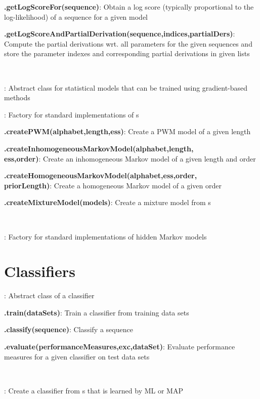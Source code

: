 \documentclass[10pt]{scrartcl}
\newcommand{\entry}[3]{{\bfseries #1#2}: #3}
\begin{document}
\begin{flushleft}
\entry{\DiffSM}{.getLogScoreFor(sequence)}{Obtain a log score (typically proportional to the log-likelihood) of a sequence for a given model}

\entry{\DiffSM}{.getLogScoreAndPartialDerivation(sequence,indices,partialDers)}{Compute the partial derivations wrt. all parameters for the given sequences and store the parameter indexes and corresponding partial derivations in given lists}

~

\entry{\AbstractDiffSM}{}{Abstract class for statistical models that can be trained using gradient-based methods}

\entry{\DiffSMFactory}{}{Factory for standard implementations of \DiffSM s}

\entry{\DiffSMFactory}{.createPWM(alphabet,length,ess)}{Create a PWM model of a given length}

\entry{\DiffSMFactory}{.createInhomogeneousMarkovModel(alphabet,length,\\ess,order)}{Create an inhomogeneous Markov model of a given length and order}

\entry{\DiffSMFactory}{.createHomogeneousMarkovModel(alphabet,ess,order,\\priorLength)}{Create a homogeneous Markov model of a given order}

\entry{\DiffSMFactory}{.createMixtureModel(models)}{Create a mixture model from \DiffSM s}

~

\entry{\HMMFactory}{}{Factory for standard implementations of hidden Markov models}

\section{Classifiers}

\entry{\AbstractClassifier}{}{Abstract class of a classifier}

\entry{\AbstractClassifier}{.train(dataSets)}{Train a classifier from training data sets}

\entry{\AbstractClassifier}{.classify(sequence)}{Classify a sequence}

\entry{\AbstractClassifier}{.evaluate(performanceMeasures,exc,dataSet)}{Evaluate performance measures for a given classifier on test data sets}

~

\entry{\TrainSMBasedClassifier}{}{Create a classifier from \TrainSM s that is learned by ML or MAP}


\end{flushleft}
\end{document}
